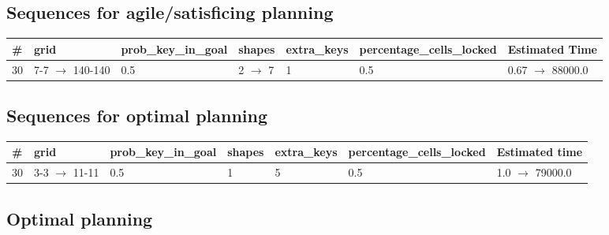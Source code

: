 \documentclass{article}
\begin{document}
                         \subsection*{Sequences for agile/satisficing planning}

                        \begin{center}
                        \begin{tabular}{@{}l|l|l|l|l|l|l@{}}
                        \# & grid & prob\_key\_in\_goal & shapes & extra\_keys & percentage\_cells\_locked & Estimated Time\\\midrule
                        30&7-7 $\rightarrow$ 140-140&0.5&2 $\rightarrow$ 7&1&0.5&0.67 $\rightarrow$ 88000.0
                        \end{tabular}
                        \end{center}
                    
                            \subsection*{Sequences for optimal planning}

                            \begin{center}
                            \begin{tabular}{@{}l|l|l|l|l|l|l@{}}
                            \# & grid & prob\_key\_in\_goal & shapes & extra\_keys & percentage\_cells\_locked & Estimated time\\\midrule
                            30&3-3 $\rightarrow$ 11-11&0.5&1&5&0.5&1.0 $\rightarrow$ 79000.0
                            \end{tabular}
                            \end{center}
                    
                                \subsection*{Optimal planning}
                                
\end{document}
